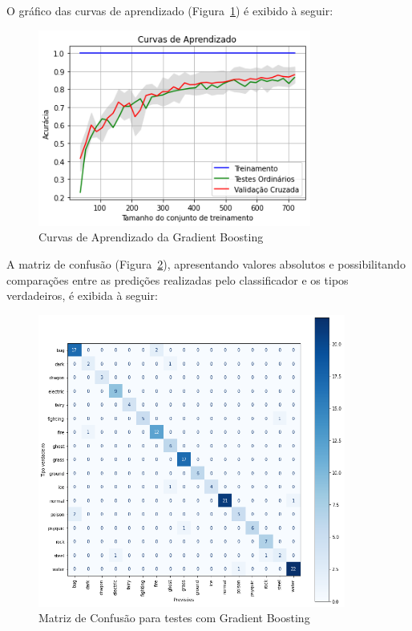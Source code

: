 \documentclass[12pt]{article}
\begin{document}
O gráfico das curvas de aprendizado (Figura~\ref{fig:exampleFig8}) é exibido à seguir:

\begin{figure}[H]
    \centering
    \includegraphics[width=0.8\textwidth]{Images/learning_curves_gradient.png}
    \caption{Curvas de Aprendizado da Gradient Boosting}
    \label{fig:exampleFig8}
\end{figure}

A matriz de confusão (Figura~\ref{fig:exampleFig9}), apresentando valores absolutos e possibilitando comparações entre as predições realizadas pelo classificador e os tipos verdadeiros, é exibida à seguir:

\begin{figure}[H]
    \centering
    \includegraphics[width=0.9\textwidth]{Images/confusion_matrix_gradient.png}
    \caption{Matriz de Confusão para testes com Gradient Boosting}
    \label{fig:exampleFig9}
\end{figure}
\end{document}
